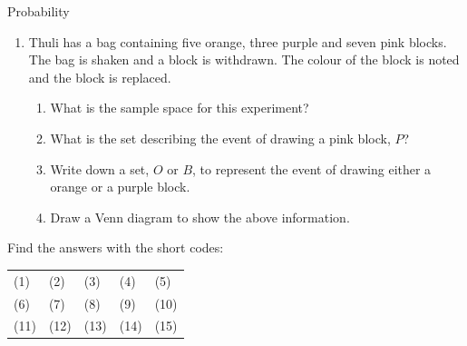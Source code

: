 \begin{eocexercises}{Probability}
\begin{enumerate}[itemsep=5pt, label=\textbf{\arabic*}. ]
  \item Thuli has a bag containing five orange, three purple and seven
    pink blocks. The bag is shaken and a block is withdrawn. The
    colour of the block is noted and the block is replaced.
    \begin{enumerate}
    \item What is the sample space for this experiment?
    \item What is the set describing the event of drawing a pink
      block, $P$?
    \item Write down a set, $O$ or $B$, to represent the event of
      drawing either a orange or a purple block.
    \item Draw a Venn diagram to show the above information.
    \end{enumerate}
  \end{enumerate}

  Find the answers with the short codes:\\
  \begin{tabularx}{\textwidth}{XXXXX}
    (1) & (2) & (3) & (4) & (5) \\
    (6) & (7) & (8) & (9) & (10) \\
    (11) & (12) & (13) & (14) & (15) \\
  \end{tabularx}
\end{eocexercises}


